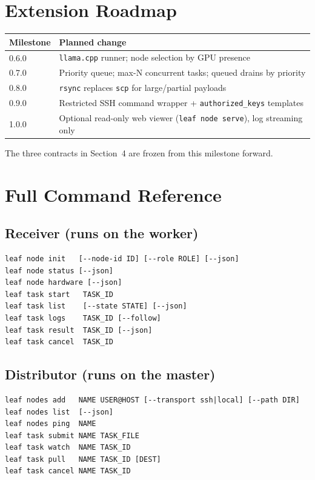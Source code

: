 \documentclass[11pt,a4paper]{article}
\begin{document}
\section{Extension Roadmap}

\begin{tabular}{@{}ll@{}}
\toprule
Milestone & Planned change \\
\midrule
0.6.0 & \texttt{llama.cpp} runner; node selection by GPU presence \\
0.7.0 & Priority queue; max-N concurrent tasks; queued drains by priority \\
0.8.0 & \texttt{rsync} replaces \texttt{scp} for large/partial payloads \\
0.9.0 & Restricted SSH command wrapper + \texttt{authorized\_keys} templates \\
1.0.0 & Optional read-only web viewer (\texttt{leaf node serve}), log streaming only \\
\bottomrule
\end{tabular}

\medskip
The three contracts in Section~4 are frozen from this milestone forward.

\section{Full Command Reference}

\subsection*{Receiver (runs on the worker)}

\begin{lstlisting}[language={}]
leaf node init   [--node-id ID] [--role ROLE] [--json]
leaf node status [--json]
leaf node hardware [--json]
leaf task start   TASK_ID
leaf task list    [--state STATE] [--json]
leaf task logs    TASK_ID [--follow]
leaf task result  TASK_ID [--json]
leaf task cancel  TASK_ID
\end{lstlisting}

\subsection*{Distributor (runs on the master)}

\begin{lstlisting}[language={}]
leaf nodes add   NAME USER@HOST [--transport ssh|local] [--path DIR]
leaf nodes list  [--json]
leaf nodes ping  NAME
leaf task submit NAME TASK_FILE
leaf task watch  NAME TASK_ID
leaf task pull   NAME TASK_ID [DEST]
leaf task cancel NAME TASK_ID
\end{lstlisting}
\end{document}
